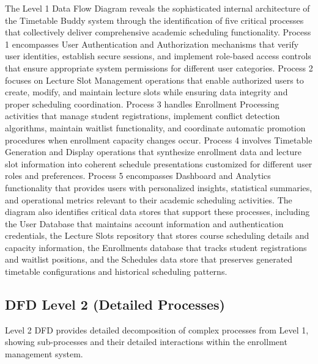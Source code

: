 The Level 1 Data Flow Diagram reveals the sophisticated internal architecture of the Timetable Buddy system through the identification of five critical processes that collectively deliver comprehensive academic scheduling functionality. Process 1 encompasses User Authentication and Authorization mechanisms that verify user identities, establish secure sessions, and implement role-based access controls that ensure appropriate system permissions for different user categories. Process 2 focuses on Lecture Slot Management operations that enable authorized users to create, modify, and maintain lecture slots while ensuring data integrity and proper scheduling coordination. Process 3 handles Enrollment Processing activities that manage student registrations, implement conflict detection algorithms, maintain waitlist functionality, and coordinate automatic promotion procedures when enrollment capacity changes occur. Process 4 involves Timetable Generation and Display operations that synthesize enrollment data and lecture slot information into coherent schedule presentations customized for different user roles and preferences. Process 5 encompasses Dashboard and Analytics functionality that provides users with personalized insights, statistical summaries, and operational metrics relevant to their academic scheduling activities. The diagram also identifies critical data stores that support these processes, including the User Database that maintains account information and authentication credentials, the Lecture Slots repository that stores course scheduling details and capacity information, the Enrollments database that tracks student registrations and waitlist positions, and the Schedules data store that preserves generated timetable configurations and historical scheduling patterns.

\subsection{DFD Level 2 (Detailed Processes)}

Level 2 DFD provides detailed decomposition of complex processes from Level 1, showing sub-processes and their detailed interactions within the enrollment management system.

